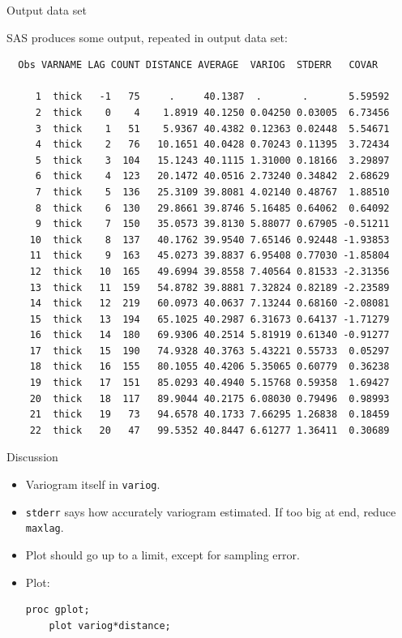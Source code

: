 \begin{frame}[fragile]{Output data set}

SAS produces some output, repeated in output data set:

{\tiny
\begin{verbatim}
  Obs VARNAME LAG COUNT DISTANCE AVERAGE  VARIOG  STDERR   COVAR

     1  thick   -1   75     .     40.1387  .       .       5.59592
     2  thick    0    4    1.8919 40.1250 0.04250 0.03005  6.73456
     3  thick    1   51    5.9367 40.4382 0.12363 0.02448  5.54671
     4  thick    2   76   10.1651 40.0428 0.70243 0.11395  3.72434
     5  thick    3  104   15.1243 40.1115 1.31000 0.18166  3.29897
     6  thick    4  123   20.1472 40.0516 2.73240 0.34842  2.68629
     7  thick    5  136   25.3109 39.8081 4.02140 0.48767  1.88510
     8  thick    6  130   29.8661 39.8746 5.16485 0.64062  0.64092
     9  thick    7  150   35.0573 39.8130 5.88077 0.67905 -0.51211
    10  thick    8  137   40.1762 39.9540 7.65146 0.92448 -1.93853
    11  thick    9  163   45.0273 39.8837 6.95408 0.77030 -1.85804
    12  thick   10  165   49.6994 39.8558 7.40564 0.81533 -2.31356
    13  thick   11  159   54.8782 39.8881 7.32824 0.82189 -2.23589
    14  thick   12  219   60.0973 40.0637 7.13244 0.68160 -2.08081
    15  thick   13  194   65.1025 40.2987 6.31673 0.64137 -1.71279
    16  thick   14  180   69.9306 40.2514 5.81919 0.61340 -0.91277
    17  thick   15  190   74.9328 40.3763 5.43221 0.55733  0.05297
    18  thick   16  155   80.1055 40.4206 5.35065 0.60779  0.36238
    19  thick   17  151   85.0293 40.4940 5.15768 0.59358  1.69427
    20  thick   18  117   89.9044 40.2175 6.08030 0.79496  0.98993
    21  thick   19   73   94.6578 40.1733 7.66295 1.26838  0.18459
    22  thick   20   47   99.5352 40.8447 6.61277 1.36411  0.30689

\end{verbatim}
}

\end{frame}

\begin{frame}[fragile]{Discussion}

\begin{itemize}
\item Variogram itself in \texttt{variog}.
\item \texttt{stderr} says how accurately variogram estimated. If too
  big at end, reduce \texttt{maxlag}.
\item Plot should go up to a limit, except for sampling error.
\item Plot:
\begin{verbatim}
proc gplot;
    plot variog*distance;
\end{verbatim}
\end{itemize}
  
\end{frame}

